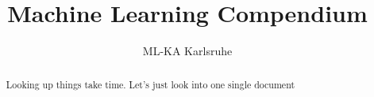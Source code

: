 \documentclass[a4paper]{article}
\title{Machine Learning Compendium}
\author{ML-KA Karlsruhe}
\begin{document}
\maketitle
\begin{abstract}
	Looking up things take time. Let's just look into one single document
\end{abstract}






\end{document}
